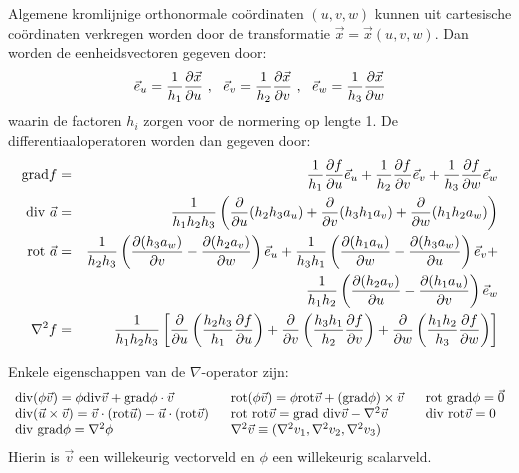 \documentclass[twoside]{report}
\begin{document}
Algemene kromlijnige orthonormale co\"ordinaten $(u,v,w)$ kunnen uit
cartesische co\"ordinaten verkregen worden door de transformatie
$\vec{x}=\vec{x}(u,v,w)$. Dan worden de eenheidsvectoren gegeven door:
\[
\vec{e}_{u}=\frac{1}{h_1}\frac{\partial \vec{x}}{\partial u}~,~~ \vec{e}_{v}=\frac{1}{h_2}\frac{\partial \vec{x}}{\partial v}~,~~
\vec{e}_{w}=\frac{1}{h_3}\frac{\partial \vec{x}}{\partial w}
\]
waarin de factoren $h_i$ zorgen voor de normering op lengte 1. De
differentiaaloperatoren worden dan gegeven door:
\begin{eqnarray*}
{\rm grad}f      &=&\frac{1}{h_1}\frac{\partial f}{\partial u}\vec{e}_{u}+\frac{1}{h_2}\frac{\partial f}{\partial v}\vec{e}_{v}+\frac{1}{h_3}\frac{\partial f}{\partial w}\vec{e}_{w}\\
{\rm div}~\vec{a}&=&\frac{1}{h_1h_2h_3}\left(\frac{\partial }{\partial u}(h_2h_3a_u)+\frac{\partial }{\partial v}(h_3h_1a_v)+\frac{\partial }{\partial w}(h_1h_2a_w)\right)\\
{\rm rot}~\vec{a}&=&\frac{1}{h_2h_3}\left(\frac{\partial (h_3a_w)}{\partial v}-\frac{\partial (h_2a_v)}{\partial w}\right)\vec{e}_{u}+
                    \frac{1}{h_3h_1}\left(\frac{\partial (h_1a_u)}{\partial w}-\frac{\partial (h_3a_w)}{\partial u}\right)\vec{e}_{v}+\\
                  &&\frac{1}{h_1h_2}\left(\frac{\partial (h_2a_v)}{\partial u}-\frac{\partial (h_1a_u)}{\partial v}\right)\vec{e}_{w}\\
\nabla^2 f       &=&\frac{1}{h_1h_2h_3}\left[\frac{\partial }{\partial u}\left(\frac{h_2h_3}{h_1}\frac{\partial f}{\partial u}\right)+
                    \frac{\partial }{\partial v}\left(\frac{h_3h_1}{h_2}\frac{\partial f}{\partial v}\right)+
                    \frac{\partial }{\partial w}\left(\frac{h_1h_2}{h_3}\frac{\partial f}{\partial w}\right)\right]
\end{eqnarray*}

Enkele eigenschappen van de $\nabla$-operator zijn:
\[
\begin{array}{l@{~~~~~}l@{~~~~~}l}
{\rm div}(\phi\vec{v})=\phi{\rm div}\vec{v}+{\rm grad}\phi\cdot\vec{v}&
{\rm rot}(\phi\vec{v})=\phi{\rm rot}\vec{v}+({\rm grad}\phi)\times\vec{v}&{\rm rot~grad}\phi=\vec{0}\\
{\rm div}(\vec{u}\times\vec{v})=\vec{v}\cdot({\rm rot}\vec{u})-\vec{u}\cdot({\rm rot}\vec{v})&
{\rm rot~rot}\vec{v}={\rm grad~div}\vec{v}-\nabla^2\vec{v}&{\rm div~rot}\vec{v}=0\\
{\rm div~grad}\phi=\nabla^2\phi&\nabla^2\vec{v}\equiv(\nabla^2v_1,\nabla^2v_2,\nabla^2v_3)
\end{array}
\]
Hierin  is $\vec{v}$ een willekeurig vectorveld en $\phi$ een willekeurig
scalarveld.
\end{document}

